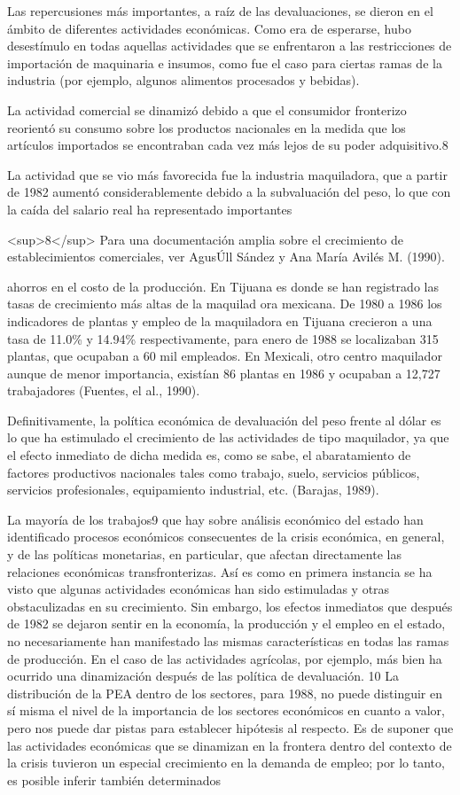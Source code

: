 \documentclass{article}
\begin{document}
Las repercusiones más importantes, a raíz de las devaluaciones, se dieron en el ámbito de diferentes actividades económicas. Como era de esperarse, hubo desestímulo en todas aquellas actividades que se enfrentaron a las restricciones de importación de maquinaria e insumos, como fue el caso para ciertas ramas de la industria (por ejemplo, algunos alimentos procesados y bebidas).

La actividad comercial se dinamizó debido a que el consumidor fronterizo reorientó su consumo sobre los productos nacionales en la medida que los artículos importados se encontraban cada vez más lejos de su poder adquisitivo.8

La actividad que se vio más favorecida fue la industria maquiladora, que a partir de 1982 aumentó considerablemente debido a la subvaluación del peso, lo que con la caída del salario real ha representado importantes

<sup>8</sup> Para una documentación amplia sobre el crecimiento de establecimientos comerciales, ver AgusÚll Sández y Ana María Avilés M. (1990).

ahorros en el costo de la producción. En Tijuana es donde se han registrado las tasas de crecimiento más altas de la maquilad ora mexicana. De 1980 a 1986 los indicadores de plantas y empleo de la maquiladora en Tijuana crecieron a una tasa de 11.0\% y 14.94\% respectivamente, para enero de 1988 se localizaban 315 plantas, que ocupaban a 60 mil empleados. En Mexicali, otro centro maquilador aunque de menor importancia, existían 86 plantas en 1986 y ocupaban a 12,727 trabajadores (Fuentes, el al., 1990).

Definitivamente, la política económica de devaluación del peso frente al dólar es lo que ha estimulado el crecimiento de las actividades de tipo maquilador, ya que el efecto inmediato de dicha medida es, como se sabe, el abaratamiento de factores productivos nacionales tales como trabajo, suelo, servicios públicos, servicios profesionales, equipamiento industrial, etc. (Barajas, 1989).

La mayoría de los trabajos9 que hay sobre análisis económico del estado han identificado procesos económicos consecuentes de la crisis económica, en general, y de las políticas monetarias, en particular, que afectan directamente las relaciones económicas transfronterizas. Así es como en primera instancia se ha visto que algunas actividades económicas han sido estimuladas y otras obstaculizadas en su crecimiento. Sin embargo, los efectos inmediatos que después de 1982 se dejaron sentir en la economía, la producción y el empleo en el estado, no necesariamente han manifestado las mismas características en todas las ramas de producción. En el caso de las actividades agrícolas, por ejemplo, más bien ha ocurrido una dinamización después de las política de devaluación. 10 La distribución de la PEA dentro de los sectores, para 1988, no puede distinguir en sí misma el nivel de la importancia de los sectores económicos en cuanto a valor, pero nos puede dar pistas para establecer hipótesis al respecto. Es de suponer que las actividades económicas que se dinamizan en la frontera dentro del contexto de la crisis tuvieron un especial crecimiento en la demanda de empleo; por lo tanto, es posible inferir también determinados
\end{document}
